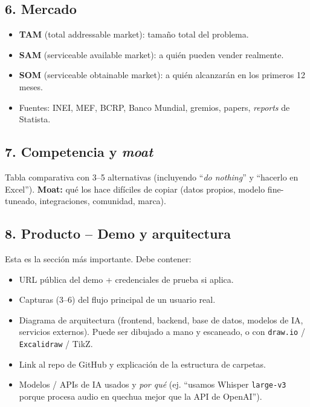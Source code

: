 \documentclass[11pt,a4paper]{article}
\begin{document}
\subsection{6. Mercado}
\begin{itemize}[leftmargin=1.2em,itemsep=2pt,topsep=2pt]
  \item \textbf{TAM} (total addressable market): tama\~no total del problema.
  \item \textbf{SAM} (serviceable available market): a qui\'en pueden vender realmente.
  \item \textbf{SOM} (serviceable obtainable market): a qui\'en alcanzar\'an
        en los primeros 12 meses.
  \item Fuentes: INEI, MEF, BCRP, Banco Mundial, gremios, papers, \emph{reports} de Statista.
\end{itemize}

\subsection{7. Competencia y \emph{moat}}
Tabla comparativa con 3--5 alternativas (incluyendo ``\emph{do nothing}''
y ``hacerlo en Excel''). \textbf{Moat:} qu\'e los hace dif\'iciles de copiar
(datos propios, modelo fine-tuneado, integraciones, comunidad, marca).

\subsection{8. Producto -- Demo y arquitectura}\label{sec:demo}
Esta es la secci\'on m\'as importante. Debe contener:
\begin{itemize}[leftmargin=1.2em,itemsep=2pt,topsep=2pt]
  \item URL p\'ublica del demo + credenciales de prueba si aplica.
  \item Capturas (3--6) del flujo principal de un usuario real.
  \item Diagrama de arquitectura (frontend, backend, base de datos, modelos de IA,
        servicios externos). Puede ser dibujado a mano y escaneado, o con
        \texttt{draw.io} / \texttt{Excalidraw} / TikZ.
  \item Link al repo de GitHub y explicaci\'on de la estructura de carpetas.
  \item Modelos / APIs de IA usados y \emph{por qu\'e} (ej. ``usamos Whisper
        \texttt{large-v3} porque procesa audio en quechua mejor que la API de OpenAI'').
\end{itemize}
\end{document}
